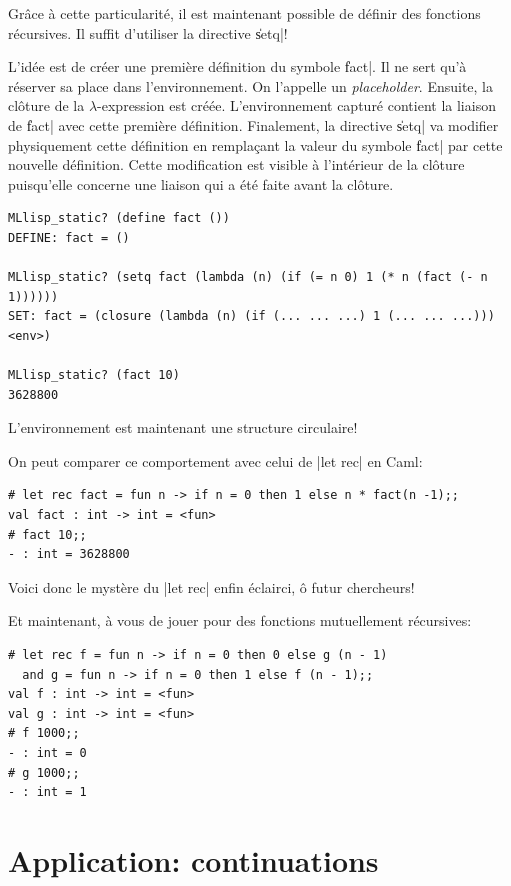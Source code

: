 \documentclass{../../LaTeX/tdsimple}
\begin{document}
Grâce à cette particularité, il est maintenant possible de définir des
fonctions récursives. Il suffit d'utiliser la directive \|setq|!

L'idée est de créer une première définition du symbole \|fact|. Il ne
sert qu'à réserver sa place dans l'environnement. On l'appelle un
\emph{placeholder}. Ensuite, la clôture de la $\lambda$-expression est
créée. L'environnement capturé contient la liaison de \|fact| avec
cette première définition. Finalement, la directive \|setq| va
modifier physiquement cette définition en remplaçant la valeur du
symbole \|fact| par cette nouvelle définition. Cette modification est
visible à l'intérieur de la clôture puisqu'elle concerne une liaison
qui a été faite avant la clôture.
\begin{lstlisting}
MLlisp_static? (define fact ())
DEFINE: fact = ()

MLlisp_static? (setq fact (lambda (n) (if (= n 0) 1 (* n (fact (- n 1))))))
SET: fact = (closure (lambda (n) (if (... ... ...) 1 (... ... ...))) <env>)

MLlisp_static? (fact 10)
3628800
\end{lstlisting}

\begin{attention}
  L'environnement est maintenant une structure circulaire!
\end{attention}

On peut comparer ce comportement avec celui de %
\raw|let rec| en Caml:
\begin{lstlisting}[language=caml]
# let rec fact = fun n -> if n = 0 then 1 else n * fact(n -1);;
val fact : int -> int = <fun>
# fact 10;;
- : int = 3628800
\end{lstlisting}
Voici donc le mystère du \raw|let rec| enfin éclairci, ô futur
chercheurs!

\begin{question}
  Et maintenant, à vous de jouer pour des fonctions mutuellement
  récursives:
\begin{lstlisting}[language=caml]
# let rec f = fun n -> if n = 0 then 0 else g (n - 1)
  and g = fun n -> if n = 0 then 1 else f (n - 1);;
val f : int -> int = <fun>
val g : int -> int = <fun>
# f 1000;;
- : int = 0
# g 1000;;
- : int = 1
\end{lstlisting}
\end{question}

\section{Application: continuations}
\end{document}
